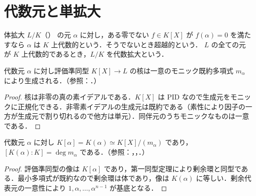 \section{代数元と単拡大}
\begin{defn}[代数元と超越元]
体拡大 $L/K$（） の元 $\alpha$ に対し，ある零でない $f\in K[X]$ が $f(\alpha)=0$ を満たすなら $\alpha$ は $K$ 上代数的という．そうでないとき超越的という． $L$ の全ての元が $K$ 上代数的であるとき，$L/K$ を代数拡大という．
\end{defn}
\begin{prop}[最小多項式]
代数元 $\alpha$ に対し評価準同型 $K[X]\to L$ の核は一意のモニック既約多項式 $m_\alpha$ により生成される．（参照：．）
\end{prop}
\begin{proof}
核は非零の真の素イデアルである．$K[X]$ は PID なので生成元をモニックに正規化できる．非零素イデアルの生成元は既約である（素性により因子の一方が生成元で割り切れるので他方は単元）．同伴元のうちモニックなものは一意である．
\end{proof}
\begin{prop}[代数的単拡大の構造]
代数元 $\alpha$ に対し $K[\alpha]=K(\alpha)\simeq K[X]/(m_\alpha)$ であり，$[K(\alpha):K]=\deg m_\alpha$ である．（参照：，，．）
\end{prop}
\begin{proof}
評価準同型の像は $K[\alpha]$ であり，第一同型定理により剰余環と同型である．最小多項式が既約なので剰余環は体であり，像は $K(\alpha)$ に等しい．剰余代表元の一意性により $1,\alpha,\ldots,\alpha^{n-1}$ が基底となる．
\end{proof}
